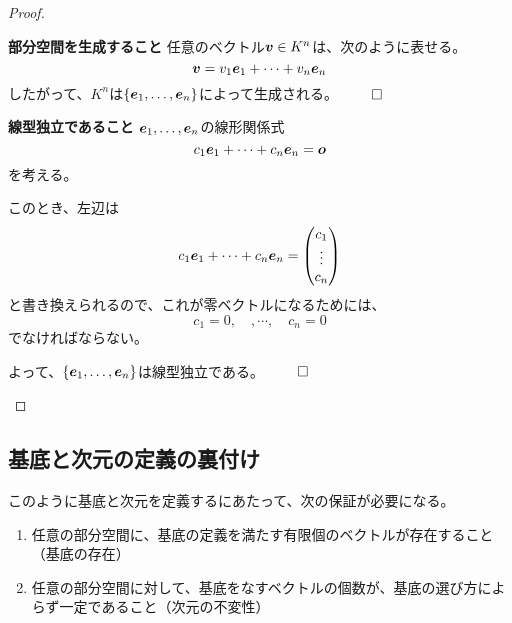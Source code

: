 \documentclass[../../../topic_linear-algebra]{subfiles}
\begin{document}
\begin{proof}
  \begin{subpattern}{\bfseries 部分空間を生成すること}
    任意のベクトル$\vb*{v} \in K^n$は、次のように表せる。
    \begin{equation*}
      \vb*{v} = v_1 \vb*{e}_1 + \cdots + v_n \vb*{e}_n
    \end{equation*}
    したがって、$K^n$は$\{ \vb*{e}_1, \dots, \vb*{e}_n \}$によって生成される。 $\qed$
  \end{subpattern}

  \begin{subpattern}{\bfseries 線型独立であること}
    $\vb*{e}_1, \dots, \vb*{e}_n$の線形関係式
    \begin{equation*}
      c_1 \vb*{e}_1 + \cdots + c_n \vb*{e}_n = \vb*{o}
    \end{equation*}
    を考える。

    このとき、左辺は
    \begin{equation*}
      c_1 \vb*{e}_1 + \cdots + c_n \vb*{e}_n = \begin{pmatrix}
        c_1    \\
        \vdots \\
        c_n
      \end{pmatrix}
    \end{equation*}
    と書き換えられるので、これが零ベクトルになるためには、
    \begin{equation*}
      c_1 = 0, \quad ,\cdots, \quad c_n = 0
    \end{equation*}
    でなければならない。

    よって、$\{ \vb*{e}_1, \dots, \vb*{e}_n \}$は線型独立である。 $\qed$
  \end{subpattern}
\end{proof}

\subsection{基底と次元の定義の裏付け}

このように基底と次元を定義するにあたって、次の保証が必要になる。

\begin{enumerate}[label=\romanlabel]
  \item 任意の部分空間に、基底の定義を満たす有限個のベクトルが存在すること（基底の存在）
  \item 任意の部分空間に対して、基底をなすベクトルの個数が、基底の選び方によらず一定であること（次元の不変性）
\end{enumerate}
\end{document}
